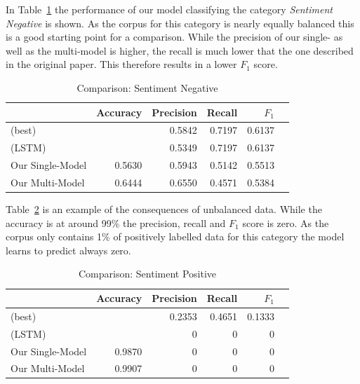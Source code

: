 \documentclass[11pt,a4paper]{article}
\begin{document}
In Table~\ref{tab:results:sentiment_negative} the performance of our model classifying the category \textit{Sentiment Negative} is shown. As the corpus for this category is nearly equally balanced this is a good starting point for a comparison. While the precision of our single- as well as the multi-model is higher, the recall is much lower that the one described in the original paper. This therefore results in a lower $F_1$ score.
\begin{table}[t!]
	\begin{center}	
	\begin{tabular}{l r r r r r}
		& Accuracy & Precision & Recall & $F_1$ \\
		\hline
		\cite{Schabus17} (best) & & 0.5842 & 0.7197 & 0.6137 \\
		\cite{Schabus17} (LSTM) & & 0.5349 & 0.7197 & 0.6137 \\
		\hline
		Our Single-Model & 0.5630 & 0.5943 & 0.5142 & 0.5513\\
		Our Multi-Model & 0.6444 & 0.6550 & 0.4571 & 0.5384 \\
	\end{tabular}  
	\end{center}
	\caption{Comparison: Sentiment Negative}
	\label{tab:results:sentiment_negative}
\end{table}

Table~\ref{tab:results:sentiment_positive} is an example of the consequences of unbalanced data. While the accuracy is at around 99\% the precision, recall and $F_1$ score is zero. As the corpus only contains 1\% of positively labelled data for this category the model learns to predict always zero.
\begin{table}[t!]
	\begin{center}	
		\begin{tabular}{l r r r r r}
			& Accuracy & Precision & Recall & $F_1$ \\
			\hline
			\cite{Schabus17} (best) & & 0.2353 & 0.4651 & 0.1333 \\
			\cite{Schabus17} (LSTM) & & 0 & 0 & 0\\
			\hline
			Our Single-Model & 0.9870 & 0 & 0 & 0 \\
			Our Multi-Model & 0.9907 & 0 & 0 & 0 \\
		\end{tabular}
	\end{center}
	\caption{Comparison: Sentiment Positive}
	\label{tab:results:sentiment_positive}
\end{table}
\end{document}
